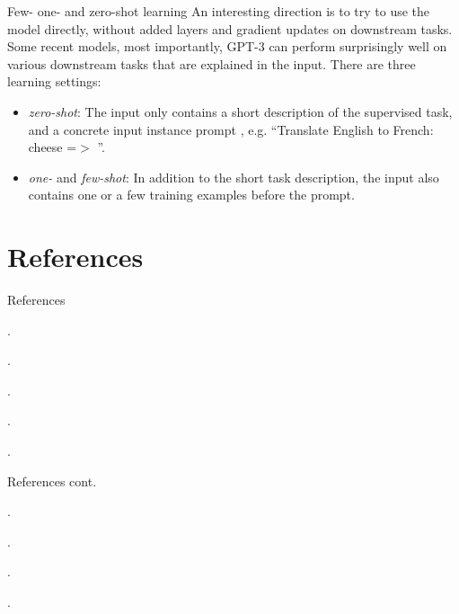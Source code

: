 \documentclass[style=upen, size=14pt]{powerdot}
\newcommand{\gold}{\color{arany}}
\theoremstyle{definition}
\begin{document}
\begin{slide}[toc=Few-shot learning]{Few- one- and zero-shot learning}
  An interesting direction is to try to use the model directly, without
  added layers and gradient updates on downstream tasks. Some recent models,
  most importantly, GPT-3 \citep{brown2020language} can perform surprisingly
  well on various downstream tasks that are explained in the input. There are
  three learning settings:
  \begin{itemize}
  \item \emph{\gold zero-shot}: The input only contains a short description of
    the supervised task, and a concrete input instance prompt , e.g. ``Translate
    English to French: cheese =$>$ ''.
  \item \emph{\gold one-} and \emph{\gold few-shot}: In addition to the short
    task description, the input also contains one or a few training examples
    before the prompt.
  \end{itemize}
  
\end{slide}

\section {References}

\begin{slide}{References}
  
  \begin{footnotesize}

    .\medskip

    .\medskip

    .\medskip

    .\medskip

    .\medskip


  \end{footnotesize}
\end{slide}

\begin{slide}[toc=]{References cont.}
  \begin{footnotesize}

    .\medskip
    
    .\medskip

    .\medskip

    .\medskip
    
  \end{footnotesize}
\end{slide}
\end{document}
